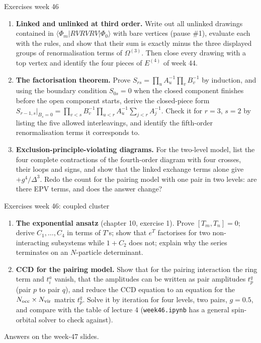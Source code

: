 \documentclass[aspectratio=169,10pt]{beamer}
\newcommand{\ph}{\Phi_0}
\begin{document}
\begin{frame}{Exercises week 46}
\small
\begin{enumerate}
\item[1.] \textbf{Linked and unlinked at third order.} Write out all unlinked drawings contained in $\langle\Phi_m|RVRVRV|\ph\rangle$ with bare vertices (pause \#1), evaluate each with the rules, and show that their sum is exactly minus the three displayed groups of renormalisation terms of $\Omega^{(3)}$. Then close every drawing with a top vertex and identify the four pieces of $E^{(4)}$ of week 44.
\item[2.] \textbf{The factorisation theorem.} Prove $S_{rs}=\prod_u A_u^{-1}\prod_v B_v^{-1}$ by induction, and using the boundary condition $S_{0s}=0$ when the closed component finishes before the open component starts, derive the closed-piece form $S_{r-1,s}|_{B_s=0}=\prod_{v<s}B_v^{-1}\prod_{u<r}A_u^{-1}\sum_{j<r}A_j^{-1}$. Check it for $r=3$, $s=2$ by listing the five allowed interleavings, and identify the fifth-order renormalisation terms it corresponds to.
\item[3.] \textbf{Exclusion-principle-violating diagrams.} For the two-level model, list the four complete contractions of the fourth-order diagram with four crosses, their loops and signs, and show that the linked exchange terms alone give $+g^4/\Delta^3$. Redo the count for the pairing model with one pair in two levels: are there EPV terms, and does the answer change?
\end{enumerate}\end{frame}

\begin{frame}{Exercises week 46: coupled cluster}
\small\begin{enumerate}
\item[4.] \textbf{The exponential ansatz} (chapter 10, exercise 1). Prove $[T_m,T_n]=0$; derive $C_1,\dots,C_4$ in terms of $T$'s; show that $e^{T}$ factorises for two non-interacting subsystems while $1+C_2$ does not; explain why the series terminates on an $N$-particle determinant.
\item[5.] \textbf{CCD for the pairing model.} Show that for the pairing interaction the ring term and $t_i^a$ vanish, that the amplitudes can be written as pair amplitudes $t_p^q$ (pair $p$ to pair $q$), and reduce the CCD equation to an equation for the $N_{\rm occ}\times N_{\rm vir}$ matrix $t_p^q$. Solve it by iteration for four levels, two pairs, $g=0.5$, and compare with the table of lecture 4 (\texttt{week46.ipynb} has a general spin-orbital solver to check against).
\end{enumerate}
\small Answers on the week-47 slides.
\end{frame}
\end{document}
